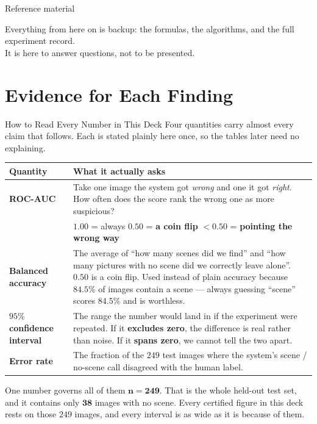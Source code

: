 \documentclass[aspectratio=169,11pt]{beamer}
\begin{document}
\begin{frame}[standout]
Reference material
\vspace{4mm}

{\normalsize Everything from here on is backup: the formulas, the algorithms, and the full experiment record.\\[2mm]
It is here to answer questions, not to be presented.}
\end{frame}

\section{Evidence for Each Finding}

\begin{frame}{How to Read Every Number in This Deck}
\small
Four quantities carry almost every claim that follows. Each is stated plainly here once, so the tables later need no explaining.
\vspace{1mm}
\begin{center}
\tiny
\begin{tabular}{@{}l p{8.7cm}@{}}
\toprule
\textbf{Quantity} & \textbf{What it actually asks} \\
\midrule
\textbf{ROC-AUC} & Take one image the system got \emph{wrong} and one it got \emph{right}. How often does the score rank the wrong one as more suspicious? \\
& \quad $1.00$ = always \quad $0.50$ = \textbf{a coin flip} \quad $<0.50$ = \textbf{pointing the wrong way} \\
\addlinespace
\textbf{Balanced accuracy} & The average of ``how many scenes did we find'' and ``how many pictures with no scene did we correctly leave alone''. $0.50$ is a coin flip. Used instead of plain accuracy because $84.5\%$ of images contain a scene --- always guessing ``scene'' scores $84.5\%$ and is worthless. \\
\addlinespace
\textbf{$95\%$ confidence interval} & The range the number would land in if the experiment were repeated. If it \textbf{excludes zero}, the difference is real rather than noise. If it \textbf{spans zero}, we cannot tell the two apart. \\
\addlinespace
\textbf{Error rate} & The fraction of the $249$ test images where the system's scene / no-scene call disagreed with the human label. \\
\bottomrule
\end{tabular}
\end{center}
\vspace{1mm}
\begin{alertblock}{\small One number governs all of them}
\footnotesize $\mathbf{n=249}$. That is the whole held-out test set, and it contains only $\mathbf{38}$ images with no scene. Every certified figure in this deck rests on those $249$ images, and every interval is as wide as it is because of them.
\end{alertblock}
\end{frame}
\end{document}

